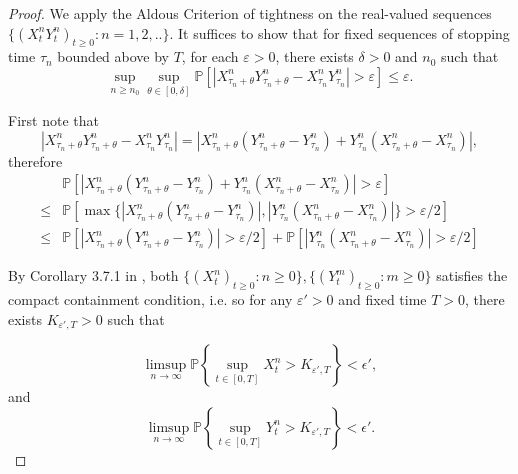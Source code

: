 \begin{proof}
We apply the Aldous Criterion of tightness on the real-valued sequences
$\{(X^n_tY^n_t)_{t \geq 0}: n=1,2,.. \}$. 
It suffices to show that
for fixed sequences of stopping time $\tau_n$ bounded above by $T$,
for each $\varepsilon>0$,
there exists $\delta > 0$ and $n_0$ such that
\begin{equation}
\sup_{n \geq n_0}\sup_{\theta \in [0, \delta]} \mathbb{P}\left[|X^n_{\tau_n+\theta}Y^n_{\tau_n+\theta} - X^n_{\tau_n}Y^n_{\tau_n} | > \varepsilon \right] \leq \varepsilon.
\end{equation}

First note that 
\begin{equation}
|X^n_{\tau_n+\theta}Y^n_{\tau_n+\theta} - X^n_{\tau_n}Y^n_{\tau_n} |
= |X^n_{\tau_n+\theta}(Y^n_{\tau_n+\theta}-Y^n_{\tau_n}) +Y^n_{\tau_n}( X^n_{\tau_n+\theta}- X^n_{\tau_n})|,
\end{equation}
therefore
\begin{equation}
\begin{aligned}
& \mathbb{P}\left[|X^n_{\tau_n+\theta}(Y^n_{\tau_n+\theta}-Y^n_{\tau_n}) +Y^n_{\tau_n}( X^n_{\tau_n+\theta}- X^n_{\tau_n})| > \varepsilon \right]\\
 \leq &
\mathbb{P}\left[\max\{|X^n_{\tau_n+\theta}(Y^n_{\tau_n+\theta}-Y^n_{\tau_n})|, | Y^n_{\tau_n}( X^n_{\tau_n+\theta}- X^n_{\tau_n}) |\}> \varepsilon/2 \right]\\
\leq & \mathbb{P}\left[|X^n_{\tau_n+\theta}(Y^n_{\tau_n+\theta}-Y^n_{\tau_n})|> \varepsilon/2 \right] + \mathbb{P}\left[ | Y^n_{\tau_n}( X^n_{\tau_n+\theta}- X^n_{\tau_n}) |> \varepsilon/2 \right]
\end{aligned}
\end{equation}

By Corollary 3.7.1 in \cite{EK}, both $\{(X^n_t)_{t \geq 0}: n \geq 0\}, \{(Y^m_t)_{t \geq 0}: m \geq 0\}$ satisfies the compact containment condition, i.e. so for any $\varepsilon'>0$ and fixed time $T> 0$, there exists $K_{\varepsilon',T}>0$ such that 

\begin{equation}
 \limsup_{n \to \infty} \mathbb{P}\left\{ \sup_{t\in [0,T]}X^n_t > K_{\varepsilon',T} \right\} < \epsilon',
\end{equation}
and 
\begin{equation}
 \limsup_{n \to \infty} \mathbb{P}\left\{ \sup_{t\in [0,T]}Y^n_t > K_{\varepsilon',T} \right\} < \epsilon'.
\end{equation}


\end{proof}
